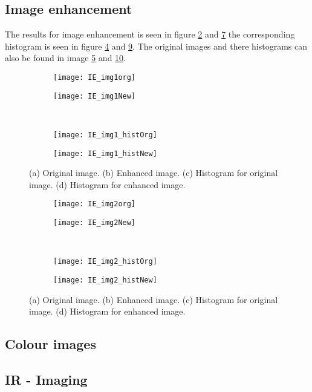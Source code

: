 \subsection{Image enhancement}
The results for image enhancement is seen in figure \ref{fig:img1new} and \ref{fig:img2new} the corresponding histogram is seen in figure \ref{fig:img1histnew} and \ref{fig:img2histnew}. The original images and there histograms can also be found in image \ref{fig:img1} and \ref{fig:img2}.
\begin{figure}[h]
	\centering
	\begin{subfigure}[b]{0.4\textwidth}
		\texttt{[image: IE\_img1org]}
		\caption{}
		\label{fig:img1org}
	\end{subfigure}
	\begin{subfigure}[b]{0.4\textwidth}
		\texttt{[image: IE\_img1New]}
		\caption{}
		\label{fig:img1new}
	\end{subfigure}
	\\
	\begin{subfigure}[b]{0.4\textwidth}
		\texttt{[image: IE\_img1\_histOrg]}
		\caption{}
		\label{fig:img1historg}
	\end{subfigure}
	\begin{subfigure}[b]{0.4\textwidth}
		\texttt{[image: IE\_img1\_histNew]}
		\caption{}
		\label{fig:img1histnew}
	\end{subfigure}
	\caption{(a) Original image. (b) Enhanced image. (c) Histogram for original image. (d) Histogram for enhanced image.}
	\label{fig:img1}
\end{figure}
\begin{figure}[h]
	\centering
	\begin{subfigure}[b]{0.4\textwidth}
		\texttt{[image: IE\_img2org]}
		\caption{}
		\label{fig:img2org}
	\end{subfigure}
	\begin{subfigure}[b]{0.4\textwidth}
		\texttt{[image: IE\_img2New]}
		\caption{}
		\label{fig:img2new}
	\end{subfigure}
	\\
	\begin{subfigure}[b]{0.4\textwidth}
		\texttt{[image: IE\_img2\_histOrg]}
		\caption{}
		\label{fig:img2historg}
	\end{subfigure}
	\begin{subfigure}[b]{0.4\textwidth}
		\texttt{[image: IE\_img2\_histNew]}
		\caption{}
		\label{fig:img2histnew}
	\end{subfigure}
	\caption{(a) Original image. (b) Enhanced image. (c) Histogram for original image. (d) Histogram for enhanced image.}
	\label{fig:img2}
\end{figure}

\subsection{Colour images}
\subsection{IR - Imaging}